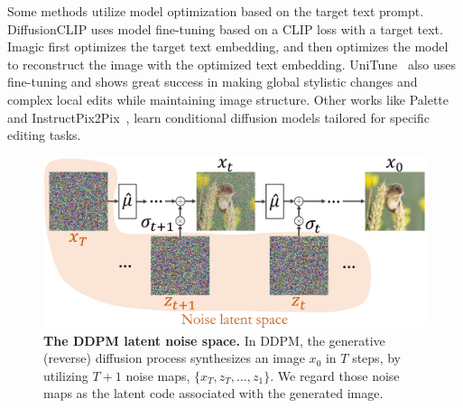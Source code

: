 Some methods utilize model optimization based on the target text prompt.  DiffusionCLIP \cite{Kim22} uses model fine-tuning based on a CLIP loss with a target text. Imagic \cite{Bahjat22} first optimizes the target text embedding, and then optimizes the model to reconstruct the image with the optimized text embedding. %
UniTune~\cite{Valevski22} also uses fine-tuning and shows great success in making global stylistic changes and complex local edits while maintaining image structure. Other works like Palette~\cite{Saharia21} and InstructPix2Pix~\cite{Brooks22}, learn conditional diffusion models tailored for specific editing tasks. %


\begin{figure}
\includegraphics[width=\columnwidth]{ICCV23_submission/figures/DDPM_sampling_process.pdf}
\caption{\textbf{The DDPM latent noise space.} In DDPM, the generative (reverse) diffusion process synthesizes an image $x_0$ in $T$ steps, by utilizing $T+1$ noise maps, $\{x_T,z_T,\ldots,z_1\}$. We regard those noise maps as the latent code associated with the generated image.}
\label{fig:unfold}
\end{figure}




